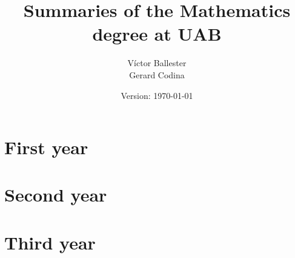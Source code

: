 \documentclass[10pt,a4paper]{report}
\title{Summaries of the Mathematics degree at UAB}
\author{Víctor Ballester\\Gerard Codina}
\date{Version: \today}
\begin{document}
\maketitle
\newpage
\tableofcontents
\newpage
\chapter{First year}
\newpage

\cleardoublepage


\cleardoublepage


\cleardoublepage


\chapter{Second year}
\newpage

\cleardoublepage


\cleardoublepage


\cleardoublepage


\cleardoublepage


\cleardoublepage


\cleardoublepage


\chapter{Third year}
\newpage

\cleardoublepage


\cleardoublepage


\cleardoublepage


\cleardoublepage


\cleardoublepage


\cleardoublepage
\end{document}

